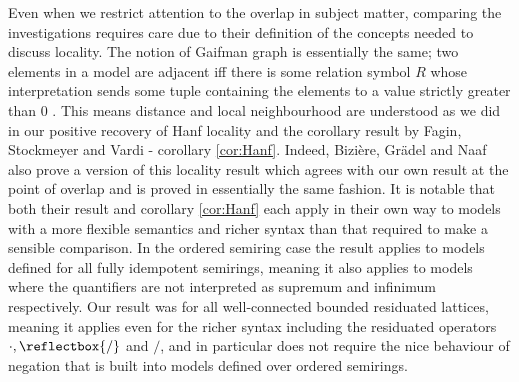 \documentclass{lmcs} %
\newcommand{\?}{\ensuremath{\mkern0.4\thinmuskip}}
\newcommand{\und}{\mathord{\reflectbox{/}}}%
\begin{document}
Even when we restrict attention to the overlap in subject matter, comparing the investigations requires care due to their definition of the concepts needed to discuss locality. The notion of Gaifman graph is essentially the same; two elements in a model are adjacent iff there is some relation symbol $R$ whose interpretation sends some tuple containing the elements to a value strictly greater than $0$ \cite[Definition 2.4]{BiziereGradelNaaf23:Localitysemiring}. This means distance and local neighbourhood are understood as we did in our positive recovery of Hanf locality and the corollary result by Fagin, Stockmeyer and Vardi - corollary \ref{cor:Hanf}. Indeed, Bizi\`{e}re, Gr\"{a}del and Naaf also prove a version of this locality result \cite[Theorem 3.6]{BiziereGradelNaaf23:Localitysemiring} which agrees with our own result at the point of overlap and is proved in essentially the same fashion. It is notable that both their result and corollary \ref{cor:Hanf} each apply in their own way to models with a more flexible semantics and richer syntax than that required to make a sensible comparison. In the ordered semiring case the result applies to models defined for all fully idempotent semirings, meaning it also applies to models where the quantifiers are not interpreted as supremum and infinimum respectively. Our result was for all well-connected bounded residuated lattices, meaning it applies even for the richer syntax including the residuated operators $\cdot,\und$ and $/$, and in particular does not require the nice behaviour of negation that is built into models defined over ordered semirings.
\end{document}
